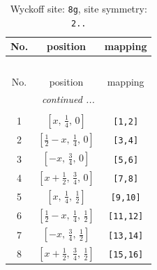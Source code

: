 \documentclass[fleqn,8pt]{jsarticle}
\begin{document}
\begin{longtable}{ccc}
\caption{Wyckoff site: {\tt 8g}, site symmetry: {\tt 2..}}
 \\
 \hline \hline
No. & position & mapping \\ \hline \endfirsthead

\multicolumn{2}{l}{\tablename\ \thetable{}} \\
 \hline \hline
No. & position & mapping \\ \hline \endhead

 \hline \hline
\multicolumn{2}{r}{\footnotesize\it continued ...} \\ \endfoot

 \hline \hline
\multicolumn{2}{r}{} \\ \endlastfoot

1 & $\left[ x,\, \frac{1}{4},\, 0 \right]$ & {\tt [1,2]} \\ \hline
2 & $\left[ \frac{1}{2} - x,\, \frac{1}{4},\, 0 \right]$ & {\tt [3,4]} \\ \hline
3 & $\left[ - x,\, \frac{3}{4},\, 0 \right]$ & {\tt [5,6]} \\ \hline
4 & $\left[ x + \frac{1}{2},\, \frac{3}{4},\, 0 \right]$ & {\tt [7,8]} \\ \hline
5 & $\left[ x,\, \frac{1}{4},\, \frac{1}{2} \right]$ & {\tt [9,10]} \\ \hline
6 & $\left[ \frac{1}{2} - x,\, \frac{1}{4},\, \frac{1}{2} \right]$ & {\tt [11,12]} \\ \hline
7 & $\left[ - x,\, \frac{3}{4},\, \frac{1}{2} \right]$ & {\tt [13,14]} \\ \hline
8 & $\left[ x + \frac{1}{2},\, \frac{3}{4},\, \frac{1}{2} \right]$ & {\tt [15,16]} \\
\end{longtable}
\renewcommand{\arraystretch}{1.2}
\end{document}
